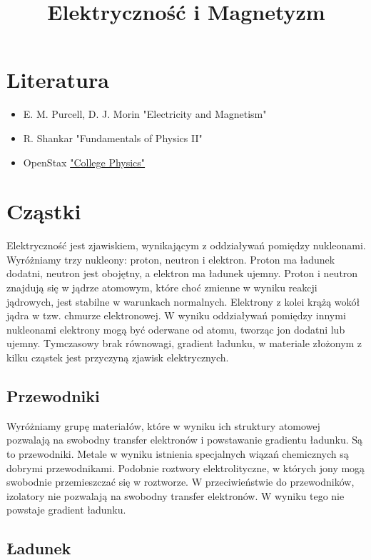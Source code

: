\documentclass{../notatki}
\title{Elektryczność i Magnetyzm}
\begin{document}
\tableofcontents

\section{Literatura}

\begin{itemize}
  \item E. M. Purcell, D. J. Morin "Electricity and Magnetism"
  \item R. Shankar "Fundamentals of Physics II"
  \item OpenStax
    \href{https://assets.openstax.org/oscms-prodcms/media/documents/College_Physics_2e-WEB_7Zesafu.pdf#%5B%7B%22num%22%3A2876%2C%22gen%22%3A0%7D%2C%7B%22name%22%3A%22XYZ%22%7D%2C0%2C734%2C0%5D}{"College
    Physics"}
\end{itemize}

\section{Cząstki}

Elektryczność jest zjawiskiem, wynikającym z oddziaływań pomiędzy nukleonami.
Wyróżniamy trzy nukleony: proton, neutron i elektron. Proton ma ładunek dodatni,
neutron jest obojętny, a elektron ma ładunek ujemny. Proton i neutron znajdują
się w jądrze atomowym, które choć zmienne w wyniku reakcji jądrowych, jest
stabilne w warunkach normalnych. Elektrony z kolei krążą wokół jądra w tzw.
chmurze elektronowej. W wyniku oddziaływań pomiędzy innymi nukleonami elektrony
mogą być oderwane od atomu, tworząc jon dodatni lub ujemny. Tymczasowy brak
równowagi, gradient ładunku, w materiale złożonym z kilku cząstek
jest przyczyną zjawisk elektrycznych.

\subsection{Przewodniki}

Wyróżniamy grupę materiałów, które w wyniku ich struktury atomowej pozwalają na
swobodny transfer elektronów i powstawanie gradientu ładunku. Są to przewodniki.
Metale w wyniku istnienia specjalnych wiązań chemicznych są dobrymi
przewodnikami.
Podobnie roztwory elektrolityczne, w których jony mogą swobodnie
przemieszczać się
w roztworze. W przeciwieństwie do przewodników, izolatory nie
pozwalają na swobodny
transfer elektronów. W wyniku tego nie powstaje gradient ładunku.

\subsection{Ładunek}
\end{document}
